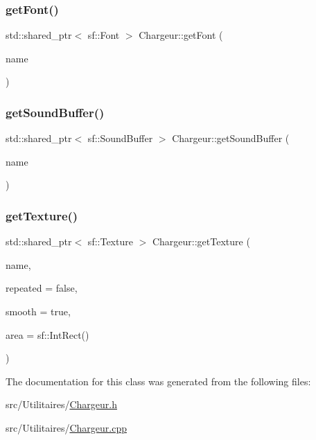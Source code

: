 \subsubsection{\texorpdfstring{get\+Font()}{getFont()}}
{\footnotesize\ttfamily std\+::shared\+\_\+ptr$<$ sf\+::\+Font $>$ Chargeur\+::get\+Font (\begin{DoxyParamCaption}\item[{const std\+::string \&}]{name }\end{DoxyParamCaption})}

\mbox{\label{class_chargeur_af10ca3942dee0356b249fd9e13a65342}} 
\subsubsection{\texorpdfstring{get\+Sound\+Buffer()}{getSoundBuffer()}}
{\footnotesize\ttfamily std\+::shared\+\_\+ptr$<$ sf\+::\+Sound\+Buffer $>$ Chargeur\+::get\+Sound\+Buffer (\begin{DoxyParamCaption}\item[{const std\+::string \&}]{name }\end{DoxyParamCaption})}

\mbox{\label{class_chargeur_a23fce63f45f73d039cbf70cd455ed995}} 
\subsubsection{\texorpdfstring{get\+Texture()}{getTexture()}}
{\footnotesize\ttfamily std\+::shared\+\_\+ptr$<$ sf\+::\+Texture $>$ Chargeur\+::get\+Texture (\begin{DoxyParamCaption}\item[{const std\+::string \&}]{name,  }\item[{const bool \&}]{repeated = {\ttfamily false},  }\item[{const bool \&}]{smooth = {\ttfamily true},  }\item[{const sf\+::\+Int\+Rect \&}]{area = {\ttfamily sf\+:\+:IntRect()} }\end{DoxyParamCaption})}



The documentation for this class was generated from the following files\+:\begin{DoxyCompactItemize}
\item 
src/\+Utilitaires/\mbox{\hyperlink{_chargeur_8h}{Chargeur.\+h}}\item 
src/\+Utilitaires/\mbox{\hyperlink{_chargeur_8cpp}{Chargeur.\+cpp}}\end{DoxyCompactItemize}
